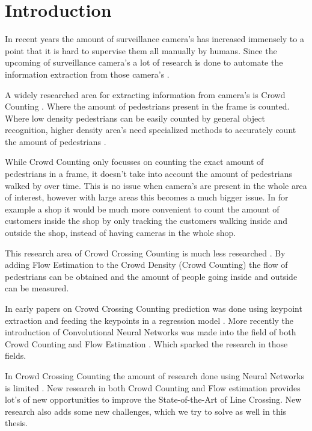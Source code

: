 \chapter{Introduction}

In recent years the amount of surveillance camera's has increased immensely to a point that it is hard to supervise them all manually by humans. Since the upcoming of surveillance camera's a lot of research is done to automate the information extraction from those camera's \cite{Sreenu2019}.

A widely researched area for extracting information from camera's is Crowd Counting \cite{Chan2008, wang2020nwpu, li2018csrnet, Fang2019, Liu2019}. Where the amount of pedestrians present in the frame is counted. Where low density pedestrians can be easily counted by general object recognition, higher density area's need specialized methods to accurately count the amount of pedestrians \cite{Zhang2016}.

While Crowd Counting only focusses on counting the exact amount of pedestrians in a frame, it doesn't take into account the amount of pedestrians walked by over time. This is no issue when camera's are present in the whole area of interest, however with large areas this becomes a much bigger issue. In for example a shop it would be much more convenient to count the amount of customers inside the shop by only tracking the customers walking inside and outside the shop, instead of having cameras in the whole shop.

This research area of Crowd Crossing Counting is much less researched \cite{leibe_crossing-line_2016, zheng_cross-line_2019}. By adding Flow Estimation to the Crowd Density (Crowd Counting) the flow of pedestrians can be obtained and the amount of people going inside and outside can be measured.

In early papers on Crowd Crossing Counting prediction was done using keypoint extraction and feeding the keypoints in a regression model \cite{ma_counting_2016, Ma2013}. More recently the introduction of Convolutional Neural Networks was made into the field of both Crowd Counting \cite{Zhang2016, Liu2019, li2018csrnet, wang2020nwpu} and Flow Estimation \cite{sun_pwc-net_2018, Dosovitskiy2015}. Which sparked the research in those fields.

In Crowd Crossing Counting the amount of research done using Neural Networks is limited \cite{leibe_crossing-line_2016, cao_large_2015}. New research in both Crowd Counting and Flow estimation provides lot's of new opportunities to improve the State-of-the-Art of Line Crossing. New research also adds some new challenges, which we try to solve as well in this thesis.

